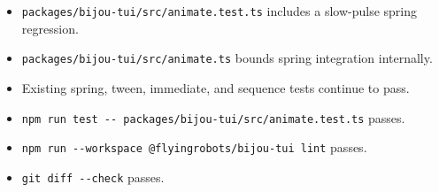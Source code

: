 \begin{itemize}
\tightlist
\item
  \texttt{p\allowbreak{}a\allowbreak{}c\allowbreak{}k\allowbreak{}a\allowbreak{}g\allowbreak{}e\allowbreak{}s\allowbreak{}/\allowbreak{}b\allowbreak{}i\allowbreak{}j\allowbreak{}o\allowbreak{}u\allowbreak{}-\allowbreak{}t\allowbreak{}u\allowbreak{}i\allowbreak{}/\allowbreak{}s\allowbreak{}r\allowbreak{}c\allowbreak{}/\allowbreak{}a\allowbreak{}n\allowbreak{}i\allowbreak{}m\allowbreak{}a\allowbreak{}t\allowbreak{}e\allowbreak{}.\allowbreak{}t\allowbreak{}e\allowbreak{}s\allowbreak{}t\allowbreak{}.\allowbreak{}t\allowbreak{}s} includes a slow-pulse spring regression.
\item
  \texttt{p\allowbreak{}a\allowbreak{}c\allowbreak{}k\allowbreak{}a\allowbreak{}g\allowbreak{}e\allowbreak{}s\allowbreak{}/\allowbreak{}b\allowbreak{}i\allowbreak{}j\allowbreak{}o\allowbreak{}u\allowbreak{}-\allowbreak{}t\allowbreak{}u\allowbreak{}i\allowbreak{}/\allowbreak{}s\allowbreak{}r\allowbreak{}c\allowbreak{}/\allowbreak{}a\allowbreak{}n\allowbreak{}i\allowbreak{}m\allowbreak{}a\allowbreak{}t\allowbreak{}e\allowbreak{}.\allowbreak{}t\allowbreak{}s} bounds spring integration internally.
\item
  Existing spring, tween, immediate, and sequence tests continue to pass.
\item
  \texttt{n\allowbreak{}p\allowbreak{}m\allowbreak{} \allowbreak{}r\allowbreak{}u\allowbreak{}n\allowbreak{} \allowbreak{}t\allowbreak{}e\allowbreak{}s\allowbreak{}t\allowbreak{} \allowbreak{}-\allowbreak{}-\allowbreak{} \allowbreak{}p\allowbreak{}a\allowbreak{}c\allowbreak{}k\allowbreak{}a\allowbreak{}g\allowbreak{}e\allowbreak{}s\allowbreak{}/\allowbreak{}b\allowbreak{}i\allowbreak{}j\allowbreak{}o\allowbreak{}u\allowbreak{}-\allowbreak{}t\allowbreak{}u\allowbreak{}i\allowbreak{}/\allowbreak{}s\allowbreak{}r\allowbreak{}c\allowbreak{}/\allowbreak{}a\allowbreak{}n\allowbreak{}i\allowbreak{}m\allowbreak{}a\allowbreak{}t\allowbreak{}e\allowbreak{}.\allowbreak{}t\allowbreak{}e\allowbreak{}s\allowbreak{}t\allowbreak{}.\allowbreak{}t\allowbreak{}s} passes.
\item
  \texttt{n\allowbreak{}p\allowbreak{}m\allowbreak{} \allowbreak{}r\allowbreak{}u\allowbreak{}n\allowbreak{} \allowbreak{}-\allowbreak{}-\allowbreak{}w\allowbreak{}o\allowbreak{}r\allowbreak{}k\allowbreak{}s\allowbreak{}p\allowbreak{}a\allowbreak{}c\allowbreak{}e\allowbreak{} \allowbreak{}@\allowbreak{}f\allowbreak{}l\allowbreak{}y\allowbreak{}i\allowbreak{}n\allowbreak{}g\allowbreak{}r\allowbreak{}o\allowbreak{}b\allowbreak{}o\allowbreak{}t\allowbreak{}s\allowbreak{}/\allowbreak{}b\allowbreak{}i\allowbreak{}j\allowbreak{}o\allowbreak{}u\allowbreak{}-\allowbreak{}t\allowbreak{}u\allowbreak{}i\allowbreak{} \allowbreak{}l\allowbreak{}i\allowbreak{}n\allowbreak{}t} passes.
\item
  \texttt{g\allowbreak{}i\allowbreak{}t\allowbreak{} \allowbreak{}d\allowbreak{}i\allowbreak{}f\allowbreak{}f\allowbreak{} \allowbreak{}-\allowbreak{}-\allowbreak{}c\allowbreak{}h\allowbreak{}e\allowbreak{}c\allowbreak{}k} passes.
\end{itemize}

